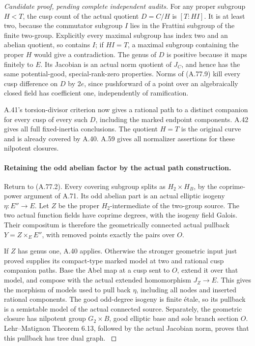 \begin{proof}[Candidate proof, pending complete independent audits]
For any proper subgroup \(H<T\), the cusp count of
the actual quotient \(D=C/H\) is \([T:HI]\).
It is at least two, because the commutator subgroup
\(I\) lies in the Frattini subgroup of the finite
two-group. Explicitly every maximal subgroup has index
two and an abelian quotient, so contains \(I\);
if \(HI=T\), a maximal subgroup containing the
proper \(H\) would give a contradiction. The genus
of \(D\) is positive because it maps finitely to
\(E\). Its Jacobian is an actual norm quotient of
\(J_C\), and hence has the same potential-good,
special-rank-zero properties. Norms of (A.77.9) kill
every cusp difference on \(D\) by \(2e\), since
pushforward of a point over an algebraically closed
field has coefficient one, independently of ramification.

A.41's torsion-divisor criterion now gives a rational
path to a distinct companion for every cusp of every
such \(D\), including the marked endpoint components.
A.42 gives all full fixed-inertia conclusions. The
quotient \(H=T\) is the original curve and is already
covered by A.40. A.59 gives all normalizer assertions
for these nilpotent closures.

\paragraph{Retaining the odd abelian factor by the actual path construction.}
Return to (A.77.2). Every covering subgroup splits as
\(H_2\times H_B\), by the coprime-power argument of
A.71. Its odd abelian part is an actual elliptic
isogeny \(\eta:E''\to E\). Let \(Z\) be the
proper \(H_2\)-intermediate of the two-group source.
The two actual function fields have coprime degrees,
with the isogeny field Galois. Their compositum is
therefore the geometrically connected actual pullback
\(Y=Z\times_EE''\), with removed points exactly
the pairs over \(O\).

If \(Z\) has genus one, A.40 applies. Otherwise the
stronger geometric input just proved supplies its
compact-type marked model at two and rational cusp
companion paths. Base the Abel map at a cusp sent
to \(O\), extend it over that model, and compose
with the actual extended homomorphism \(J_Z\to E\).
This gives the morphism of models used to pull back
\(\eta\), including all nodes and inserted rational
components.
\cite[Theorem 1.1 and Proposition 3.2]{fghDupuyRabinoff}
The good odd-degree isogeny is finite \'{e}tale, so
its pullback is a semistable model of the actual
connected source. Separately, the geometric closure
has nilpotent group \(G_2\times B\), good elliptic
base and sole branch section \(O\). Lehr--Matignon
Theorem 6.13, followed by the actual Jacobian norm,
proves that this pullback has tree dual graph.
\cite[Theorem 6.13]{fghLehrMatignon2005}


\end{proof}
